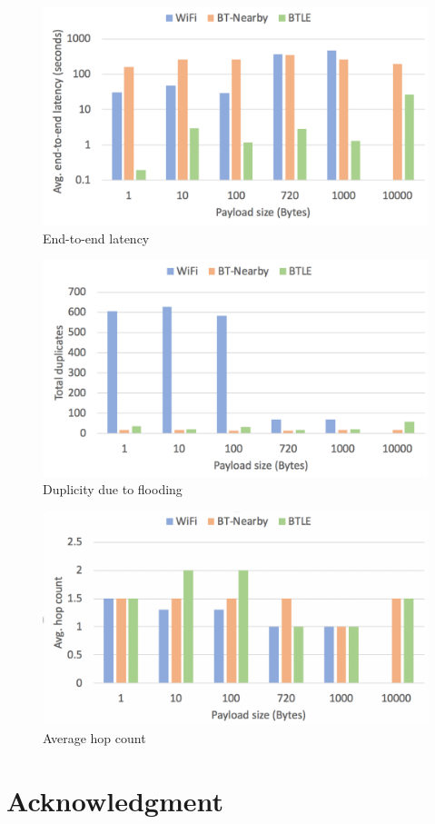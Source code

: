 \documentclass[conference]{IEEEtran}
\begin{document}
\begin{figure}[htbp]
\centerline{\includegraphics[width=\columnwidth]{figs/e2e_latency}}
\caption{End-to-end latency}
\label{fig:e2e}
\end{figure}

\begin{figure}[htbp]
\centerline{\includegraphics[width=\columnwidth]{figs/duplicates}}
\caption{Duplicity due to flooding}
\label{fig:dup}
\end{figure}

\begin{figure}[htbp]
\centerline{\includegraphics[width=\columnwidth]{figs/hops}}
\caption{Average hop count}
\label{fig:hop}
\end{figure}

\section*{Acknowledgment}



\end{document}

